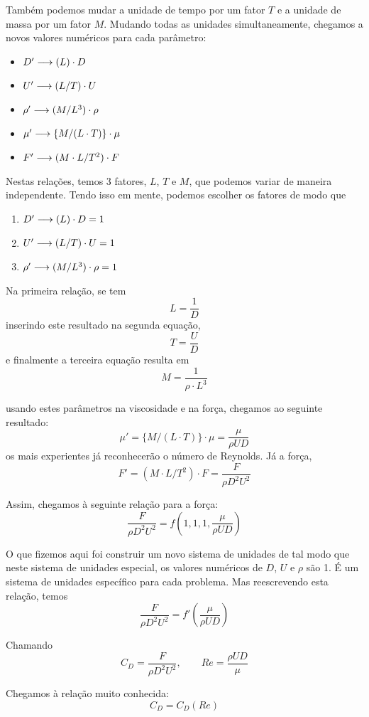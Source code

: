 Também podemos mudar a unidade de tempo por um fator $T$ e a unidade de massa por um fator $M$. Mudando todas as unidades simultaneamente, chegamos a novos valores numéricos para cada parâmetro:

\begin{itemize}
\item $D' \longrightarrow (L) \cdot D$
\item $U' \longrightarrow (L/T) \cdot U$
\item $\rho' \longrightarrow  (M/L^3) \cdot\rho$
\item $\mu' \longrightarrow \{M/(L\cdot T)\}\cdot\mu$
\item $F' \longrightarrow (M \cdot L / T^2) \cdot F$
\end{itemize}


Nestas relações, temos 3 fatores, $L$, $T$ e $M$, que podemos variar de maneira independente. Tendo isso em mente, podemos escolher os fatores de modo que
\begin{enumerate}
\item $D' \longrightarrow (L) \cdot D = 1$
\item $U' \longrightarrow (L/T) \cdot U = 1$
\item $\rho' \longrightarrow  (M/L^3) \cdot\rho = 1$
\end{enumerate}

Na primeira relação, se tem
\[
L = \frac{1}{D}
\]
inserindo este resultado na segunda equação,
\[
T = \frac{U}{D}
\]
e finalmente a terceira equação resulta em
\[
M = \frac{1}{\rho \cdot L^3}
\]

usando estes parâmetros na viscosidade e na força, chegamos ao seguinte resultado:
\[
\mu' = \{M/(L\cdot T)\}\cdot\mu = \frac{\mu}{\rho U D}
\]
os mais experientes já reconhecerão o número de Reynolds. Já a força,
\[
F' = (M \cdot L / T^2) \cdot F = \frac{F}{\rho D^2 U^2}
\]

Assim, chegamos à seguinte relação para a força:
\[
\frac{F}{\rho D^2 U^2} = f\left(1, 1, 1, \frac{\mu}{\rho U D}\right)
\] 

O que fizemos aqui foi construir um novo sistema de unidades de tal modo que neste sistema de unidades especial, os valores numéricos de $D$, $U$ e $\rho$ são 1. É um sistema de unidades específico para cada problema. Mas reescrevendo esta relação, temos
\[
\frac{F}{\rho D^2 U^2} = f'\left(\frac{\mu}{\rho U D}\right)
\] 

Chamando
\[
C_D = \frac{F}{\rho D^2 U^2}, \qquad Re = \frac{\rho U D}{\mu}
\]

Chegamos à relação muito conhecida:
\[
C_D = C_D(Re)
\]


